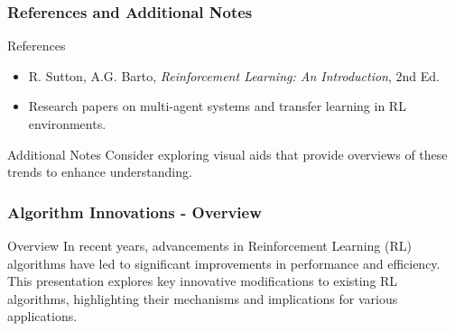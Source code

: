 \documentclass{beamer}
\begin{document}
\begin{frame}[fragile]
    \frametitle{References and Additional Notes}

    \begin{block}{References}
        \begin{itemize}
            \item R. Sutton, A.G. Barto, \textit{Reinforcement Learning: An Introduction}, 2nd Ed.
            \item Research papers on multi-agent systems and transfer learning in RL environments.
        \end{itemize}
    \end{block}

    \begin{block}{Additional Notes}
        Consider exploring visual aids that provide overviews of these trends to enhance understanding.
    \end{block}
\end{frame}

\begin{frame}[fragile]
    \frametitle{Algorithm Innovations - Overview}
    \begin{block}{Overview}
        In recent years, advancements in Reinforcement Learning (RL) algorithms have led to significant improvements in performance and efficiency. 
        This presentation explores key innovative modifications to existing RL algorithms, highlighting their mechanisms and implications for various applications.
    \end{block}
\end{frame}
\end{document}
